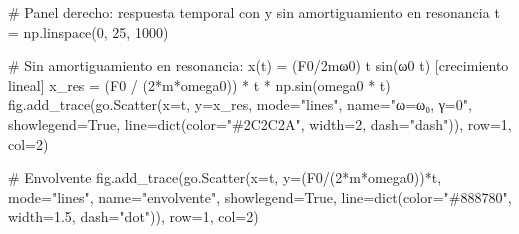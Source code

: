 \documentclass[
  letterpaper,
  DIV=11,
  numbers=noendperiod]{scrreprt}
\newenvironment{Shaded}{\begin{snugshade}}{\end{snugshade}}
\newcommand{\BuiltInTok}[1]{\textcolor[rgb]{0.00,0.23,0.31}{#1}}
\newcommand{\CommentTok}[1]{\textcolor[rgb]{0.37,0.37,0.37}{#1}}
\newcommand{\DecValTok}[1]{\textcolor[rgb]{0.68,0.00,0.00}{#1}}
\newcommand{\FloatTok}[1]{\textcolor[rgb]{0.68,0.00,0.00}{#1}}
\newcommand{\NormalTok}[1]{\textcolor[rgb]{0.00,0.23,0.31}{#1}}
\newcommand{\OperatorTok}[1]{\textcolor[rgb]{0.37,0.37,0.37}{#1}}
\newcommand{\StringTok}[1]{\textcolor[rgb]{0.13,0.47,0.30}{#1}}
\newcommand{\VariableTok}[1]{\textcolor[rgb]{0.07,0.07,0.07}{#1}}
\begin{document}
\begin{Shaded}
\begin{Highlighting}[]
\CommentTok{\# Panel derecho: respuesta temporal con y sin amortiguamiento en resonancia}
\NormalTok{t }\OperatorTok{=}\NormalTok{ np.linspace(}\DecValTok{0}\NormalTok{, }\DecValTok{25}\NormalTok{, }\DecValTok{1000}\NormalTok{)}

\CommentTok{\# Sin amortiguamiento en resonancia: x(t) = (F0/2mω0) t sin(ω0 t) [crecimiento lineal]}
\NormalTok{x\_res }\OperatorTok{=}\NormalTok{ (F0 }\OperatorTok{/}\NormalTok{ (}\DecValTok{2}\OperatorTok{*}\NormalTok{m}\OperatorTok{*}\NormalTok{omega0)) }\OperatorTok{*}\NormalTok{ t }\OperatorTok{*}\NormalTok{ np.sin(omega0 }\OperatorTok{*}\NormalTok{ t)}
\NormalTok{fig.add\_trace(go.Scatter(x}\OperatorTok{=}\NormalTok{t, y}\OperatorTok{=}\NormalTok{x\_res, mode}\OperatorTok{=}\StringTok{"lines"}\NormalTok{,}
\NormalTok{    name}\OperatorTok{=}\StringTok{"ω=ω₀, γ=0"}\NormalTok{, showlegend}\OperatorTok{=}\VariableTok{True}\NormalTok{,}
\NormalTok{    line}\OperatorTok{=}\BuiltInTok{dict}\NormalTok{(color}\OperatorTok{=}\StringTok{"\#2C2C2A"}\NormalTok{, width}\OperatorTok{=}\DecValTok{2}\NormalTok{, dash}\OperatorTok{=}\StringTok{"dash"}\NormalTok{)), row}\OperatorTok{=}\DecValTok{1}\NormalTok{, col}\OperatorTok{=}\DecValTok{2}\NormalTok{)}

\CommentTok{\# Envolvente}
\NormalTok{fig.add\_trace(go.Scatter(x}\OperatorTok{=}\NormalTok{t, y}\OperatorTok{=}\NormalTok{(F0}\OperatorTok{/}\NormalTok{(}\DecValTok{2}\OperatorTok{*}\NormalTok{m}\OperatorTok{*}\NormalTok{omega0))}\OperatorTok{*}\NormalTok{t, mode}\OperatorTok{=}\StringTok{"lines"}\NormalTok{,}
\NormalTok{    name}\OperatorTok{=}\StringTok{"envolvente"}\NormalTok{, showlegend}\OperatorTok{=}\VariableTok{True}\NormalTok{,}
\NormalTok{    line}\OperatorTok{=}\BuiltInTok{dict}\NormalTok{(color}\OperatorTok{=}\StringTok{"\#888780"}\NormalTok{, width}\OperatorTok{=}\FloatTok{1.5}\NormalTok{, dash}\OperatorTok{=}\StringTok{"dot"}\NormalTok{)), row}\OperatorTok{=}\DecValTok{1}\NormalTok{, col}\OperatorTok{=}\DecValTok{2}\NormalTok{)}


\end{Highlighting}
\end{Shaded}
\end{document}
